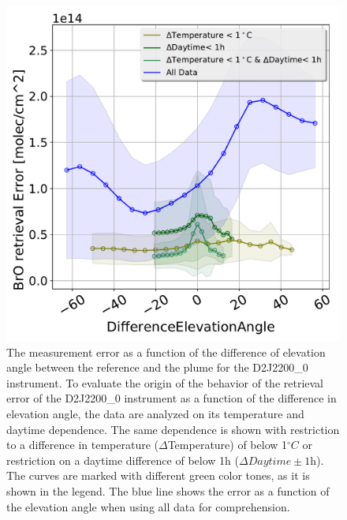 \begin{figure}
    \centering
    \includegraphics[width=0.7\linewidth]{Bilder/DiffElevAngleKomischesInstr}
    \caption[The  measurement error as a function of the difference of elevation angle between the reference and the plume for the D2J2200\_0 instrument.]{The  measurement error as a function of the difference of elevation angle between the reference and the plume for the D2J2200\_0 instrument. To evaluate the origin of the behavior of the  retrieval error of the D2J2200\_0 instrument as a function of the difference in elevation angle, the data are analyzed on its temperature and daytime dependence. The same dependence is shown with restriction to a difference in temperature ($\Delta$Temperature) of below 1$^{\circ}C$ or restriction on a daytime difference of below 1h ($\Delta Daytime \pm 1$h). The curves are marked with different green color tones, as it is shown in the legend. The blue line shows the  error as a function of the elevation angle when using all data for comprehension.}
    \label{fig:d2j22000diffelevangleonetempnevad}
\end{figure}


